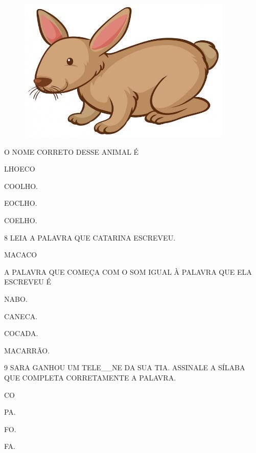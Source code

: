 \begin{figure}[htpb]
\centering
\includegraphics[width=.5\textwidth]{media/image246.jpg}
\end{figure}

O NOME CORRETO DESSE ANIMAL É

\begin{escolha}
\item LHOECO

\item COOLHO.

\item EOCLHO.

\item COELHO.
\end{escolha}

\num{8} LEIA A PALAVRA QUE CATARINA ESCREVEU.

\begin{myquote}
MACACO
\end{myquote}

A PALAVRA QUE COMEÇA COM O SOM IGUAL À PALAVRA QUE ELA ESCREVEU É 

\begin{escolha}
\item NABO.

\item CANECA.

\item COCADA.

\item MACARRÃO.
\end{escolha}

\coment{}

\num{9} SARA GANHOU UM TELE\_\_NE DA SUA TIA. ASSINALE A SÍLABA QUE COMPLETA CORRETAMENTE A PALAVRA.

\begin{escolha}
\item CO

\item PA.

\item FO.

\item FA.
\end{escolha}

